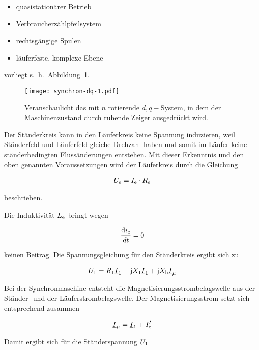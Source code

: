 \begin{itemize}
	\item quasistationärer Betrieb
	\item Verbraucherzählpfeilsystem
	\item rechtsgängige Spulen
	\item läuferfeste, komplexe Ebene
\end{itemize}

vorliegt s.~h.~Abbildung~\ref{fig:dq-synchron-1}.

\begin{figure}[!h]
\centering
\texttt{[image: synchron-dq-1.pdf]}
\label{fig:dq-synchron-1}
\caption{Veranschaulicht das mit $n$ rotierende $d, q-$System, in dem der Maschinenzustand durch ruhende Zeiger ausgedrückt wird.}
\end{figure}

Der Ständerkreis kann in den Läuferkreis keine Spannung induzieren, weil Ständerfeld und Läuferfeld gleiche Drehzahl haben und somit im Läufer keine ständerbedingten Flussänderungen entstehen.
Mit dieser Erkenntnis und den oben genannten Voraussetzungen wird der Läuferkreis durch die Gleichung

\begin{align}
U_{\mathrm{e}} = I_{\mathrm{e}} \cdot R_{\mathrm{e}}
\end{align}

beschrieben.

Die Induktivität $L_{\mathrm{e}}$ bringt wegen

\begin{align*}
\frac{\mathrm{d}i_{\mathrm{e}}}{dt} = 0
\end{align*}

keinen Beitrag.
Die Spannungsgleichung für den Ständerkreis ergibt sich zu

\begin{align}
U_{\mathrm{1}} = R_{\mathrm{1}}\underline{I}_{\mathrm{1}}+\mathrm{j}X_{\mathrm{1}}\underline{I}_{\mathrm{1}}+\mathrm{j}X_{\mathrm{h}}\underline{I}_\mu
\end{align}

Bei der Synchronmaschine entsteht die Magnetisierungsstrombelagswelle aus der Ständer- und der Läuferstrombelagswelle.
Der Magnetisierungsstrom setzt sich entsprechend zusammen

\begin{align}
\underline{I}_\mu = \underline{I}_{\mathrm{1}} + I'_{\mathrm{e}}
\end{align}

Damit ergibt sich für die Ständerspannung $U_{\mathrm{1}}$

